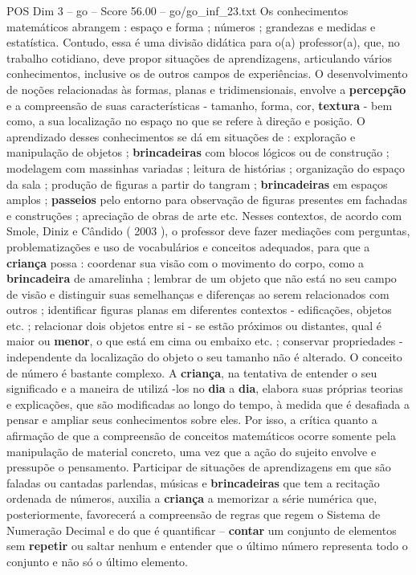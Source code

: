 \begin{textsample}{POS Dim 3 – go – Score 56.00 – go/go\_inf\_23.txt}
Os conhecimentos matemáticos abrangem : espaço e forma ; números ; grandezas e medidas e estatística.
Contudo, essa é uma divisão didática para o(a) professor(a), que, no trabalho cotidiano, deve propor situações de aprendizagens, articulando vários conhecimentos, inclusive os de outros campos de experiências.
O desenvolvimento de noções relacionadas às formas, planas e tridimensionais, envolve a \textbf{percepção} e a compreensão de suas características - tamanho, forma, cor, \textbf{textura} - bem como, a sua localização no espaço no que se refere à direção e posição.
O aprendizado desses conhecimentos se dá em situações de : exploração e manipulação de objetos ; \textbf{brincadeiras} com blocos lógicos ou de construção ; modelagem com massinhas variadas ; leitura de histórias ; organização do espaço da sala ; produção de figuras a partir do tangram ; \textbf{brincadeiras} em espaços amplos ; \textbf{passeios} pelo entorno para observação de figuras presentes em fachadas e construções ; apreciação de obras de arte etc.
Nesses contextos, de acordo com Smole, Diniz e Cândido ( 2003 ), o professor deve fazer mediações com perguntas, problematizações e uso de vocabulários e conceitos adequados, para que a \textbf{criança} possa : coordenar sua visão com o movimento do corpo, como a \textbf{brincadeira} de amarelinha ; lembrar de um objeto que não está no seu campo de visão e distinguir suas semelhanças e diferenças ao serem relacionados com outros ; identificar figuras planas em diferentes contextos - edificações, objetos etc. ; relacionar dois objetos entre si - se estão próximos ou distantes, qual é maior ou \textbf{menor}, o que está em cima ou embaixo etc. ; conservar propriedades - independente da localização do objeto o seu tamanho não é alterado.
O conceito de número é bastante complexo.
A \textbf{criança}, na tentativa de entender o seu significado e a maneira de utilizá -los no \textbf{dia} a \textbf{dia}, elabora suas próprias teorias e explicações, que são modificadas ao longo do tempo, à medida que é desafiada a pensar e ampliar seus conhecimentos sobre eles.
Por isso, a crítica quanto a afirmação de que a compreensão de conceitos matemáticos ocorre somente pela manipulação de material concreto, uma vez que a ação do sujeito envolve e pressupõe o pensamento.
Participar de situações de aprendizagens em que são faladas ou cantadas parlendas, músicas e \textbf{brincadeiras} que tem a recitação ordenada de números, auxilia a \textbf{criança} a memorizar a série numérica que, posteriormente, favorecerá a compreensão de regras que regem o Sistema de Numeração Decimal e do que é quantificar – \textbf{contar} um conjunto de elementos sem \textbf{repetir} ou saltar nenhum e entender que o último número representa todo o conjunto e não só o último elemento.

\end{textsample}
